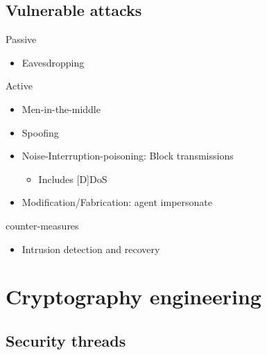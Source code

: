 \documentclass{beamer}
\begin{document}

\subsection{Vulnerable attacks}

\begin{frame}
    \begin{block}{Passive}
        \begin{itemize}
            \item Eavesdropping
        \end{itemize}
    \end{block}
    \begin{block}{Active}
        \begin{itemize}
            \item Men-in-the-middle
            \item Spoofing
            \item Noise-Interruption-poisoning: Block transmissions
            \begin{itemize}
                \item Includes [D]DoS
            \end{itemize}
            \item Modification/Fabrication: agent impersonate
        \end{itemize}
    \end{block}
    \begin{block}{counter-measures}
        \begin{itemize}
            \item Intrusion detection and recovery
        \end{itemize}
    \end{block}
\end{frame}

\section{Cryptography engineering}

\subsection{Security threads}
\end{document}
